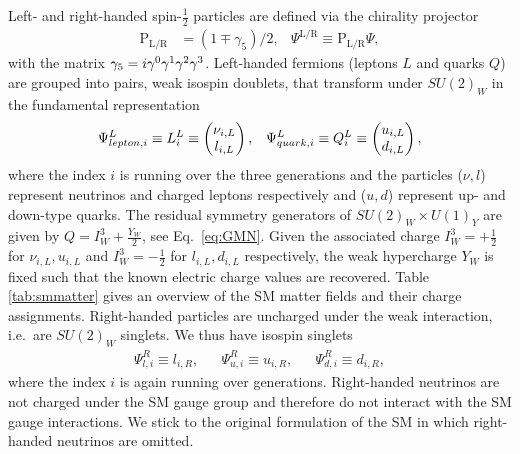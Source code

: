  Left- and right-handed spin-$\frac{1}{2}$ particles are defined via the
 chirality projector 
 \begin{align}
 \text{P}_{\text{L/R}}&=(1\mp \gamma_5)/2,& \Psi^{\text{L/R}}\equiv  \text{P}_{\text{L/R}} \Psi,
 \end{align}
with the matrix $\g5=i\gamma^0\gamma^1\gamma^2\gamma^3$. Left-handed fermions (leptons $L$ and quarks $Q$) are grouped into pairs, weak
isospin doublets, that transform under $SU(2)_W$ in the
fundamental representation
\begin{align}
 \Psi_{lepton,i}^L \equiv L_i^L\equiv \pmqty{\nu_{i,L}\\l_{i,L}}, && \Psi_{quark,i}^L\equiv Q_i^L \equiv \pmqty{u_{i,L}\\d_{i,L}},
\end{align}
where the index $i$ is running over the three generations and the
particles ($\nu, l$) represent neutrinos and charged leptons
respectively and ($u, d$) represent up- and down-type
quarks. The residual symmetry generators of $SU(2)_W\times
U(1)_Y$ are given by $Q = I_W^3+\frac{Y_W}{2}$, see
Eq.~\eqref{eq:GMN}. Given the associated charge $I_W^3=+\frac{1}{2}$ for
$\nu_{i,L},u_{i,L}$ and $I_W^3=-\frac{1}{2}$ for $l_{i,L},d_{i,L}$ respectively, the weak hypercharge $Y_W$ is fixed such
that the known electric charge values are recovered. Table
\ref{tab:smmatter} gives an overview of
the SM matter fields and their charge assignments. Right-handed particles are uncharged under the weak interaction, i.e.\ are $SU(2)_W$ singlets. We thus have isospin singlets 
\begin{align}
  \Psi_{l,i}^R\equiv l_{i,R}, &&
   \Psi_{u,i}^R\equiv u_{i,R}, &&\Psi_{d,i}^R\equiv d_{i,R},
\end{align}
where the index $i$ is again running over generations. Right-handed
neutrinos are not charged under the SM
gauge group and therefore do not interact with the SM gauge
interactions. We stick to the original formulation of the SM in which right-handed
neutrinos are omitted. 


